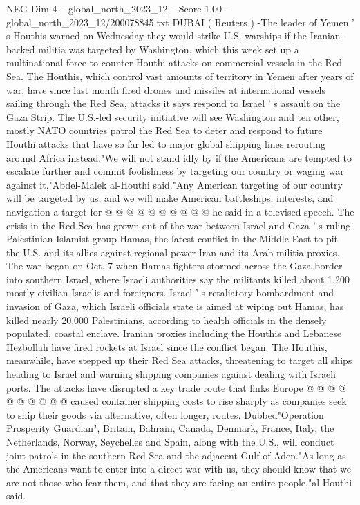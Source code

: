 \begin{textsample}{NEG Dim 4 – global\_north\_2023\_12 – Score 1.00 – global\_north\_2023\_12/200078845.txt}  \label{ex:f4_neg_152}
DUBAI ( Reuters ) -The leader of Yemen ' s Houthis warned on Wednesday they would strike U.S. warships if the Iranian-backed militia was targeted by Washington, which this week set up a multinational force to counter Houthi attacks on commercial vessels in the Red Sea.
The Houthis, which control vast amounts of territory in Yemen after years of war, have since last month fired drones and missiles at international vessels sailing through the Red Sea, attacks it says respond to Israel ' s assault on the Gaza Strip.
The U.S.-led security initiative will see Washington and ten other, mostly NATO countries patrol the Red Sea to deter and respond to future Houthi attacks that have so far led to major global shipping lines rerouting around Africa instead."We will not stand idly by if the Americans are tempted to escalate further and commit foolishness by targeting our country or waging war against it,"Abdel-Malek al-Houthi said."Any American targeting of our country will be targeted by us, and we will make American battleships, interests, and navigation a target for @ @ @ @ @ @ @ @ @ @ he said in a televised speech.
The crisis in the Red Sea has grown out of the war between Israel and Gaza ' s ruling Palestinian Islamist group Hamas, the latest conflict in the Middle East to pit the U.S. and its allies against regional power Iran and its Arab militia proxies.
The war began on Oct. 7 when Hamas fighters stormed across the Gaza border into southern Israel, where Israeli authorities say the militants killed about 1,200 mostly civilian Israelis and foreigners.
Israel ' s retaliatory bombardment and invasion of Gaza, which Israeli officials state is aimed at wiping out Hamas, has killed nearly 20,000 Palestinians, according to health officials in the densely populated, coastal enclave.
Iranian proxies including the Houthis and Lebanese Hezbollah have fired rockets at Israel since the conflict began.
The Houthis, meanwhile, have stepped up their Red Sea attacks, threatening to target all ships heading to Israel and warning shipping companies against dealing with Israeli ports.
The attacks have disrupted a key trade route that links Europe @ @ @ @ @ @ @ @ @ @ caused container shipping costs to rise sharply as companies seek to ship their goods via alternative, often longer, routes.
Dubbed"Operation Prosperity Guardian", Britain, Bahrain, Canada, Denmark, France, Italy, the Netherlands, Norway, Seychelles and Spain, along with the U.S., will conduct joint patrols in the southern Red Sea and the adjacent Gulf of Aden."As long as the Americans want to enter into a direct war with us, they should know that we are not those who fear them, and that they are facing an entire people,"al-Houthi said.

\end{textsample}
